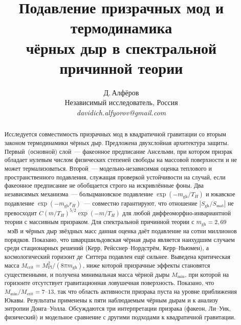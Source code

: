 \documentclass[12pt,a4paper]{article}
\newcommand{\MPl}{M_{\mathrm{Pl}}}
\newcommand{\Mcrit}{M_{\mathrm{crit}}}
\newcommand{\mghost}{m_{\mathrm{gh}}}
\newcommand{\Thr}{T_{\!H}}
\theoremstyle{plain}
\theoremstyle{definition}
\begin{document}
\title{Подавление призрачных мод и термодинамика\\
чёрных дыр в спектральной причинной теории}

\author{Д.\,Алфёров\\[4pt]
\small Независимый исследователь, Россия\\[2pt]
\small\textit{davidich.alfyorov@gmail.com}}

\date{}

\maketitle

\begin{abstract}
Исследуется совместимость призрачных мод в квадратичной гравитации со
вторым законом термодинамики чёрных дыр. Предложена двухслойная
архитектура защиты. Первый~(основной) слой~--- факеонное предписание
Ансельми, при котором призрак обладает нулевым числом физических степеней
свободы на массовой поверхности и не может термализоваться. Второй~---
модельно-независимая оценка теплового и пространственного подавления,
служащая проверкой устойчивости на случай, если факеонное предписание
не обобщается строго на искривлённые фоны. Два независимых механизма~---
больцмановское подавление $\exp(-\mghost/\Thr)$ и юкавское подавление
$\exp(-\mghost r_H)$~--- совместно гарантируют, что отношение
$|\dot S_{\mathrm{gh}}/\dot S_{\mathrm{mat}}|$ не превосходит
$C(m/\Thr)^{5/2}\exp(-m/\Thr)$ для любой диффеоморфно-инвариантной
теории с массивным призраком. Для спектральной причинной теории
с $\mghost = 2{,}69$~мэВ и чёрных дыр звёздных масс данная оценка
даёт подавление на сотни миллионов порядков. Показано, что шварцшильдовская
чёрная дыра является наихудшим случаем среди стационарных решений
(Керр, Рейсснер--Нордстрём, Керр--Ньюмен), а космологический горизонт
де~Ситтера подавлен ещё сильнее. Выведена критическая масса
$\Mcrit = \MPl^2/(8\pi\mghost)$, ниже которой призрачные эффекты
становятся существенными, и получена минимальная масса чёрной дыры
$M_{\min}$, при которой на горизонте отсутствует гравитационная
ловушечная поверхность. Показано, что $M_{\min}/\Mcrit = 7$--$13$, так
что область активности призрака пуста на уровне приближения Юкавы.
Результаты применены к пяти наблюдаемым чёрным дырам и к анализу
энтропии Донга--Уолла. Обсуждаются три интерпретации призрака
(факеон, Ли--Уик, физический) и модельное сравнение с другими
подходами к квадратичной гравитации.
\end{abstract}
\end{document}
